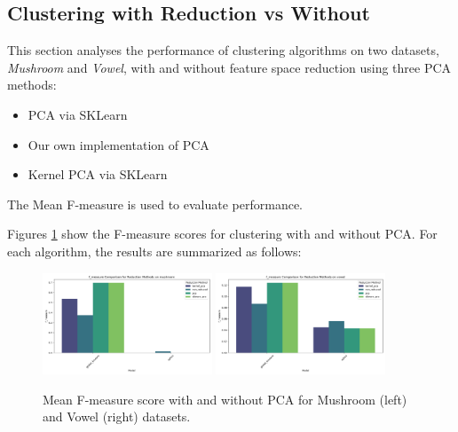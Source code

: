 \subsection{Clustering with Reduction vs Without}
\label{subsec:clustering-with-reduction-vs-without}

This section analyses the performance of clustering algorithms on two datasets, \textit{Mushroom} and \textit{Vowel}, with and without feature space reduction using three PCA methods:
\begin{itemize}
    \item PCA via SKLearn
    \item Our own implementation of PCA
    \item Kernel PCA via SKLearn
\end{itemize}
The Mean F-measure is used to evaluate performance.

Figures \ref{fig:clustering-results} show the F-measure scores for clustering with and without PCA. For each algorithm, the results are summarized as follows:

\begin{figure}[!h]
    \centering
    \includegraphics[width=0.45\textwidth]{figures/f_measure_comparison_mushroom.png}
    \includegraphics[width=0.45\textwidth]{figures/f_measure_comparison_vowel.png}
    \caption{Mean F-measure score with and without PCA for Mushroom (left) and Vowel (right) datasets.}
\label{fig:clustering-results}
\end{figure}

